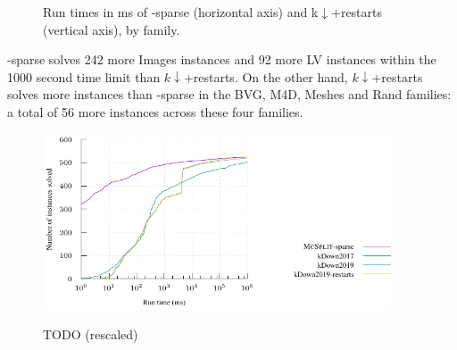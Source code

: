 \begin{figure}[htb]
    \caption{Run times in ms of \McSplit-sparse (horizontal axis) and k$\downarrow$+restarts (vertical axis), by family.}
    \label{figure:mcsplit-sparse-scatter-by-family}
\end{figure}

\McSplit-sparse solves 242 more Images instances and 92 more LV instances
within the 1000 second time limit than $k\downarrow$+restarts. On the other
hand, $k\downarrow$+restarts solves more instances than \McSplit-sparse in the
BVG, M4D, Meshes and Rand families: a total of 56 more instances across these
four families.

\begin{figure}[htb]
    \centering
    \caption{TODO (rescaled)}
    \includegraphics*[width=0.92\textwidth]{14b-mcsplit-induced-si/sip-instances-mcis-experiment/experiment/plots/cumulative-rescaled.pdf}
    \label{figure:mcsplit-sparse-cumulative-rescaled}
\end{figure}

